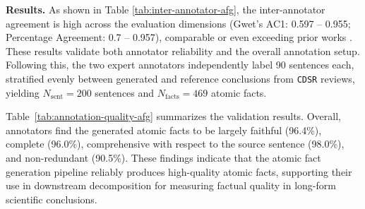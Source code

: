 \documentclass{article}
\newcommand{\xhdr}[1]{%
  \noindent\textbf{#1.}
}
\begin{document}
\begin{table}[t]
\centering
\setlength{\tabcolsep}{2pt} 
\footnotesize
\caption{Label distribution across evaluation dimensions for atomic facts. Overall, the results are reported over $N_{\text{sent}}{=}200$ sentences (evenly stratified between generated and reference conclusions from \texttt{CDSR}), corresponding to $N_{\text{facts}}{=}469$ atomic facts. Abbreviations: Compre. = Comprehensive, Partial = Partially Comprehensive, Not Compre. = Not Comprehensive.}
\vspace{2pt}
\label{tab:annotation-quality-afg}
\end{table}

\xhdr{Results} As shown in Table \ref{tab:inter-annotator-afg}, the inter-annotator agreement is high across the evaluation dimensions (Gwet's AC1: 0.597 -- 0.955; Percentage Agreement: 0.7 -- 0.957), comparable or even exceeding prior works \cite{kaur2025whosaskingsimulatingrolebased, liu-etal-2025-verifact, mir-etal-2019-evaluating, park-etal-2024-valuescope}. These results validate both annotator reliability and the overall annotation setup. Following this, the two expert annotators independently label 90 sentences each, stratified evenly between generated and reference conclusions from \texttt{CDSR} reviews, yielding $N_{\text{sent}}{=}200$ sentences and $N_{\text{facts}}{=}469$ atomic facts.

Table~\ref{tab:annotation-quality-afg} summarizes the validation results. Overall, annotators find the generated atomic facts to be largely faithful (96.4\%), complete (96.0\%), comprehensive with respect to the source sentence (98.0\%), and non-redundant (90.5\%).  These findings indicate that the atomic fact generation pipeline reliably produces high-quality atomic facts, supporting their use in downstream decomposition for measuring factual quality in long-form scientific conclusions.
\end{document}
